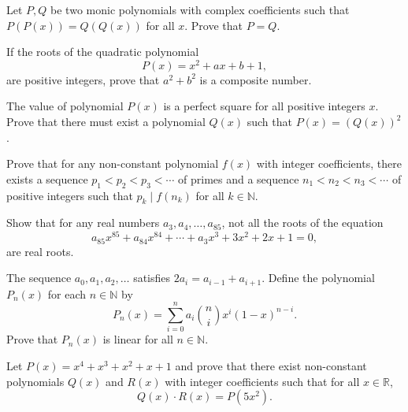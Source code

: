 \begin{question}[name={2000 Romania TST}]
    Let $P,Q$ be two monic polynomials with complex coefficients such that $P(P(x))=Q(Q(x))$ for all $x$. Prove that $P=Q$.
\end{question}

\begin{question}[name={1986 USSR}]
    If the roots of the quadratic polynomial \[P(x)=x^2+ax+b+1,\] are positive integers, prove that $a^2+b^2$ is a composite number.
\end{question}


\begin{question}
    The value of polynomial $P(x)$ is a perfect square for all positive integers $x$. Prove that there must exist a polynomial $Q(x)$ such that $P(x)=(Q(x))^2$.
\end{question}


\begin{question}[name={1998 Iran}]
    Prove that for any non-constant polynomial $f(x)$ with integer coefficients, there exists a sequence $p_1<p_2<p_3<\cdots$ of primes and a sequence $n_1<n_2<n_3<\cdots$ of positive integers such that $p_k \mid f(n_k)$ for all $k \in \mathbb N$.
\end{question}


\begin{question}[name={1996 Taiwan}]
    Show that for any real numbers $a_{3},a_{4},\dots,a_{85}$, not all the roots of the equation 
    \[a_{85}x^{85}+a_{84}x^{84}+\cdots+a_{3}x^{3}+3x^{2}+2x+1=0,\] are real roots.
\end{question}



\begin{question}[name={1998 Iran}]
    The sequence $a_0,a_1,a_2,\dots$ satisfies $2a_i = a_{i-1} + a_{i+1}$. Define the polynomial $P_n(x)$ for each $n\in\mathbb N$ by
    \[P_n(x) = \sum_{i=0}^n a_i \binom{n}{i} x^i (1-x)^{n-i}.\]
    Prove that $P_n(x)$ is linear for all $n\in \mathbb N$.
\end{question}



\begin{question}[name={1995 Austrian--Polish}]
    Let $P(x)=x^4+x^3+x^2+x+1$ and prove that there exist non-constant polynomials $Q(x)$ and $R(x)$ with integer coefficients such that for all $x\in\mathbb R$,
    \[Q(x) \cdot R(x) = P(5x^2).\]
\end{question}


